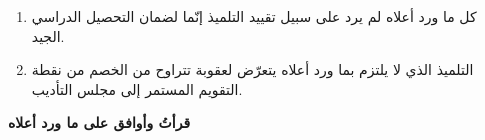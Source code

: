 \documentclass[12pt, a4paper]{article}
\begin{document}
\vspace{0.8cm}

\begin{notebox}
  \begin{enumerate}[label=\textcolor{primary}{\arabic*.\,}, leftmargin=2em]
    \item كل ما ورد أعلاه لم يرد على سبيل تقييد التلميذ إنّما لضمان
          التحصيل الدراسي الجيد.
    \item التلميذ الذي لا يلتزم بما ورد أعلاه يتعرّض لعقوبة تتراوح من
          الخصم من نقطة التقويم المستمر إلى مجلس التأديب.
    
  \end{enumerate}
\end{notebox}

\vspace{0.8cm}

\begin{center}
  {\large\bfseries\color{primary} قرأتُ وأوافق على ما ورد أعلاه}
\end{center}
\end{document}
